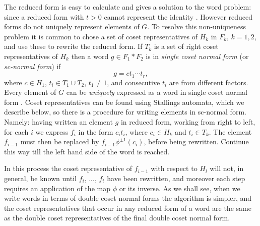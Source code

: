 \documentclass[a4paper,12pt]{article}
\numberwithin{equation}{section}
\numberwithin{figure}{section}
\begin{document}
The reduced form is easy to calculate and gives a solution to the word problem: since
a reduced form with $t>0$ cannot represent the identity \cite[Theorem 2.6]{LS}.
However reduced forms do not uniquely represent
 elements of $G$. To resolve this non-uniqueness problem it is common to
chose a set of coset representatives of $H_k$ in $F_k$, $k=1,2$, and use these to rewrite
the reduced form. If $T_k$ is a set of right coset representatives of $H_k$ then
 a word $g\in F_1\ast F_2$ is in \emph{single coset normal form} (or \emph{sc-normal 
form}) if
\[g=ct_1\cdots t_r,\]
where $c\in H_1$, $t_i\in T_1\cup T_2$, $t_1\neq 1$, and consecutive $t_i$ are from
different factors. Every element of $G$ can be \emph{uniquely} expressed as a word in 
single coset
normal form \cite[Theorem 4.4]{MKS}.
Coset representatives can be found using Stallings automata, which we describe below, so
there is a procedure for writing elements in sc-normal form. Namely:
having written an element $g$ in reduced form,
working from right to left, for each $i$
 we express $f_i$ in the
form $c_it_i$, where $c_i\in H_k$ and $t_i\in T_k$. The element $f_{i-1}$ must 
then be replaced
by $f_{i-1}\phi^{\pm 1}(c_i)$, before being rewritten. Continue this way till the
left hand side of the word is reached.

In this process the coset representative of
$f_{i-1}$ with respect to $H_l$ will not, in general, be known
 until $f_i$, ..., $f_t$ have been rewritten, and moreover each step requires an 
application
of the map $\phi$ or its inverse. As we shall see, when we write words in terms of
double
coset normal forms the algorithm is simpler, and the coset representatives that
occur in any reduced  form of a word are the same as
the double coset representatives of the final double coset normal form.
\end{document}
